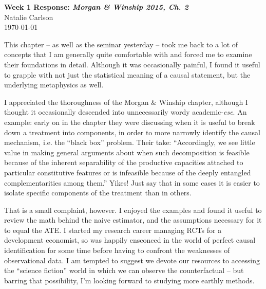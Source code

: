 \documentclass[12pt]{article}
\begin{document}
\begin{center}
  \Large \textbf{Week 1 Response: \textit{Morgan \& Winship 2015, Ch. 2}} \\
  \vspace{0.1in}
  \normalsize Natalie Carlson \\
  \today
\end{center}

This chapter -- as well as the seminar yesterday -- took me back to a lot of concepts that I am generally quite comfortable with and forced me to examine their foundations in detail. Although it was occasionally painful, I found it useful to grapple with not just the statistical meaning of a causal statement, but the underlying metaphysics as well. 

I appreciated the thoroughness of the Morgan \& Winship chapter, although I thought it occasionally descended into unnecessarily wordy academic-\textit{ese}. An example: early on in the chapter they were discussing when it is useful to break down a treatment into components, in order to more narrowly identify the causal mechanism, i.e. the ``black box'' problem. Their take: ``Accordingly, we see little value in making general arguments about when such decomposition is feasible because of the inherent separability of the productive capacities attached to particular constitutive features or is infeasible because of the deeply entangled complementarities among them.'' Yikes! Just say that in some cases it is easier to isolate specific components of the treatment than in others. 

That is a small complaint, however. I enjoyed the examples and found it useful to review the math behind the naive estimator, and the assumptions necessary for it to equal the ATE. I started my research career managing RCTs for a development economist, so was happily ensconced in the world of perfect causal identification for some time before having to confront the weaknesses of observational data. I am tempted to suggest we devote our resources to accessing the ``science fiction'' world in which we can observe the counterfactual -- but barring that possibility, I'm looking forward to studying more earthly methods.  
\end{document}

